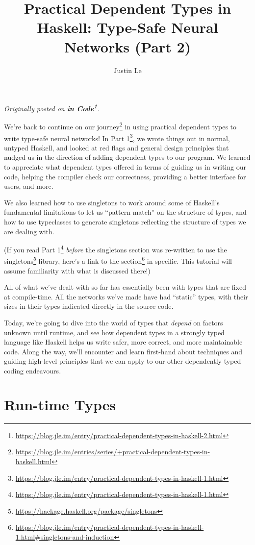 \documentclass[]{article}
\title{Practical Dependent Types in Haskell: Type-Safe Neural Networks (Part 2)}
\author{Justin Le}
\renewcommand{\href}[2]{#2\footnote{\url{#1}}}
\begin{document}
\maketitle

\emph{Originally posted on
\textbf{\href{https://blog.jle.im/entry/practical-dependent-types-in-haskell-2.html}{in
Code}}.}

We're back to continue on
\href{https://blog.jle.im/entries/series/+practical-dependent-types-in-haskell.html}{our
journey} in using practical dependent types to write type-safe neural networks!
In
\href{https://blog.jle.im/entry/practical-dependent-types-in-haskell-1.html}{Part
1}, we wrote things out in normal, untyped Haskell, and looked at red flags and
general design principles that nudged us in the direction of adding dependent
types to our program. We learned to appreciate what dependent types offered in
terms of guiding us in writing our code, helping the compiler check our
correctness, providing a better interface for users, and more.

We also learned how to use singletons to work around some of Haskell's
fundamental limitations to let us ``pattern match'' on the structure of types,
and how to use typeclasses to generate singletons reflecting the structure of
types we are dealing with.

(If you read
\href{https://blog.jle.im/entry/practical-dependent-types-in-haskell-1.html}{Part
1} \emph{before} the singletons section was re-written to use the
\href{https://hackage.haskell.org/package/singletons}{singletons} library,
\href{https://blog.jle.im/entry/practical-dependent-types-in-haskell-1.html\#singletons-and-induction}{here's
a link to the section} in specific. This tutorial will assume familiarity with
what is discussed there!)

All of what we've dealt with so far has essentially been with types that are
fixed at compile-time. All the networks we've made have had ``static'' types,
with their sizes in their types indicated directly in the source code.

Today, we're going to dive into the world of types that \emph{depend} on factors
unknown until runtime, and see how dependent types in a strongly typed language
like Haskell helps us write safer, more correct, and more maintainable code.
Along the way, we'll encounter and learn first-hand about techniques and guiding
high-level principles that we can apply to our other dependently typed coding
endeavours.

\section{Run-time Types}\label{run-time-types}
\end{document}
